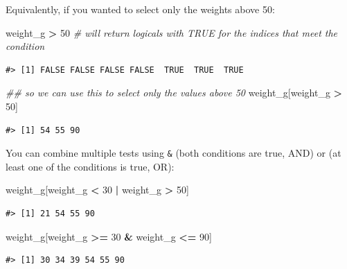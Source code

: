 \documentclass[
]{book}
\newenvironment{Shaded}{\begin{snugshade}}{\end{snugshade}}
\newcommand{\CommentTok}[1]{\textcolor[rgb]{0.56,0.35,0.01}{\textit{#1}}}
\newcommand{\DecValTok}[1]{\textcolor[rgb]{0.00,0.00,0.81}{#1}}
\newcommand{\NormalTok}[1]{#1}
\newcommand{\OperatorTok}[1]{\textcolor[rgb]{0.81,0.36,0.00}{\textbf{#1}}}
\newcommand{\StringTok}[1]{\textcolor[rgb]{0.31,0.60,0.02}{#1}}
\begin{document}
Equivalently, if you wanted to select only the weights above 50:

\begin{Shaded}
\begin{Highlighting}[]
\NormalTok{weight_g }\OperatorTok{>}\StringTok{ }\DecValTok{50}    \CommentTok{# will return logicals with TRUE for the indices that meet the condition}
\end{Highlighting}
\end{Shaded}

\begin{verbatim}
#> [1] FALSE FALSE FALSE FALSE  TRUE  TRUE  TRUE
\end{verbatim}

\begin{Shaded}
\begin{Highlighting}[]
\CommentTok{## so we can use this to select only the values above 50}
\NormalTok{weight_g[weight_g }\OperatorTok{>}\StringTok{ }\DecValTok{50}\NormalTok{]}
\end{Highlighting}
\end{Shaded}

\begin{verbatim}
#> [1] 54 55 90
\end{verbatim}

You can combine multiple tests using \texttt{\&} (both conditions are true, AND) or \texttt{\textbar{}}
(at least one of the conditions is true, OR):

\begin{Shaded}
\begin{Highlighting}[]
\NormalTok{weight_g[weight_g }\OperatorTok{<}\StringTok{ }\DecValTok{30} \OperatorTok{|}\StringTok{ }\NormalTok{weight_g }\OperatorTok{>}\StringTok{ }\DecValTok{50}\NormalTok{]}
\end{Highlighting}
\end{Shaded}

\begin{verbatim}
#> [1] 21 54 55 90
\end{verbatim}

\begin{Shaded}
\begin{Highlighting}[]
\NormalTok{weight_g[weight_g }\OperatorTok{>=}\StringTok{ }\DecValTok{30} \OperatorTok{&}\StringTok{ }\NormalTok{weight_g }\OperatorTok{<=}\StringTok{ }\DecValTok{90}\NormalTok{]}
\end{Highlighting}
\end{Shaded}

\begin{verbatim}
#> [1] 30 34 39 54 55 90
\end{verbatim}
\end{document}
